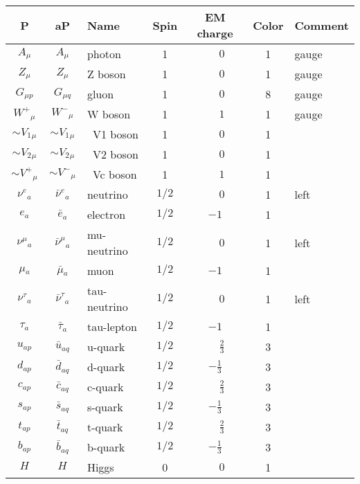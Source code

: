 \begin{tabular}{|cc|l|c|c|c|l|} \hline
P & aP & Name & Spin  & EM charge & Color & Comment \\ \hline
$A_{\mu }$&$A_{\mu }$&photon        &1           & $\phantom{-}0$ &1    &gauge\\
$Z_{\mu }$&$Z_{\mu }$&Z boson       &1           & $\phantom{-}0$ &1    &gauge\\
$G_{\mu p}$&$G_{\mu q}$&gluon         &1           & $\phantom{-}0$ &8    &gauge\\
$W^+{}_{\mu }$&$W^-{}_{\mu }$&W boson       &1           &$\phantom{-}1$ &1    &gauge\\
$\sim V_1{}_{\mu }$&$\sim V_1{}_{\mu }$&~V1 boson     &1           & $\phantom{-}0$ &1    &   \\
$\sim V_2{}_{\mu }$&$\sim V_2{}_{\mu }$&~V2 boson     &1           & $\phantom{-}0$ &1    &   \\
$\sim V^+{}_{\mu }$&$\sim V^-{}_{\mu }$&~Vc boson     &1           &$\phantom{-}1$ &1    &   \\
$\nu^e{}_{a}$&$\bar{\nu}^e{}_{a}$&neutrino      &$1/2$       & $\phantom{-}0$ &1    &left\\
$e{}_{a}$ &$\bar{e}{}_{a}$&electron      &$1/2$       &$-1$ &1    &   \\
$\nu^\mu{}_{a}$&$\bar{\nu}^\mu{}_{a}$&mu-neutrino   &$1/2$       & $\phantom{-}0$ &1    &left\\
$\mu{}_{a}$&$\bar{\mu}{}_{a}$&muon          &$1/2$       &$-1$ &1    &   \\
$\nu^\tau{}_{a}$&$\bar{\nu}^\tau{}_{a}$&tau-neutrino  &$1/2$       & $\phantom{-}0$ &1    &left\\
$\tau{}_{a}$&$\bar{\tau}{}_{a}$&tau-lepton    &$1/2$       &$-1$ &1    &   \\
$u{}_{ap}$&$\bar{u}{}_{aq}$&u-quark       &$1/2$       &$\phantom{-}\frac{2}{3}$ &3    &   \\
$d{}_{ap}$&$\bar{d}{}_{aq}$&d-quark       &$1/2$       &$-\frac{1}{3}$ &3    &   \\
$c{}_{ap}$&$\bar{c}{}_{aq}$&c-quark       &$1/2$       &$\phantom{-}\frac{2}{3}$ &3    &   \\
$s{}_{ap}$&$\bar{s}{}_{aq}$&s-quark       &$1/2$       &$-\frac{1}{3}$ &3    &   \\
$t{}_{ap}$&$\bar{t}{}_{aq}$&t-quark       &$1/2$       &$\phantom{-}\frac{2}{3}$ &3    &   \\
$b{}_{ap}$&$\bar{b}{}_{aq}$&b-quark       &$1/2$       &$-\frac{1}{3}$ &3    &   \\
$H_{}$    &$H_{}$    &Higgs         &0           & $\phantom{-}0$ &1    &   \\ \hline
\end{tabular}

